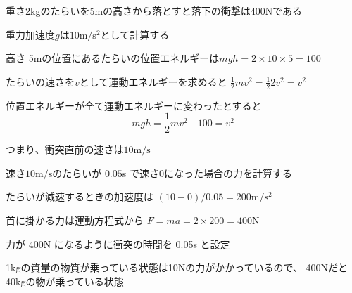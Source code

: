 \documentclass[12pt,b5paper]{ltjsarticle}
\begin{document}
\hrulefill

重さ2kgのたらいを5mの高さから落とすと落下の衝撃は400Nである

\hrulefill

重力加速度$g$は$10 \mathrm{m}/\mathrm{s}^2$として計算する

\dotfill


高さ 5mの位置にあるたらいの位置エネルギーは$mgh=2\times 10 \times 5 =100$

たらいの速さを$v$として運動エネルギーを求めると
$\frac{1}{2}mv^2 = \frac{1}{2}2v^2=v^2$

位置エネルギーが全て運動エネルギーに変わったとすると
\begin{equation}
 mgh = \frac{1}{2}mv^2 \quad 100=v^2
\end{equation}

つまり、衝突直前の速さは$10\mathrm{m}/\mathrm{s}$



速さ$10\mathrm{m}/\mathrm{s}$のたらいが $0.05$s で速さ0になった場合の力を計算する

たらいが減速するときの加速度は
$(10-0)/0.05 = 200 \mathrm{m}/\mathrm{s}^2$

首に掛かる力は運動方程式から
$F=ma = 2 \times 200 =400 \mathrm{N}$

\dotfill

力が 400N になるように衝突の時間を 0.05s と設定

1kgの質量の物質が乗っている状態は10Nの力がかかっているので、
400Nだと40kgの物が乗っている状態
\end{document}
